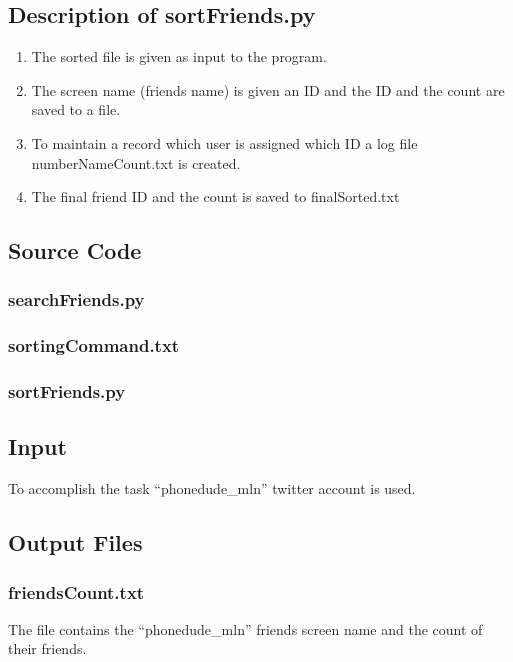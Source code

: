 \documentclass[12pt]{article}
\begin{document}
\subsection{Description of sortFriends.py}
\begin{enumerate}
	\item The sorted file is given as input to the program.
	\item The screen name (friends name) is given an ID and the ID and the count are saved to a file.
	\item To maintain a record which user is assigned which ID a log file numberNameCount.txt is created.
	\item The final friend ID and the count is saved to finalSorted.txt
\end{enumerate}
\newpage
\subsection{Source Code}
\subsubsection{searchFriends.py}

\newpage

\subsubsection{sortingCommand.txt}


\subsubsection{sortFriends.py}

\newpage
\subsection{Input}
To accomplish the task ``phonedude\_mln'' twitter account is used.
\subsection{Output Files}
\subsubsection{friendsCount.txt}
The file contains the ``phonedude\_mln'' friends screen name and the count of their friends.

\end{document}
